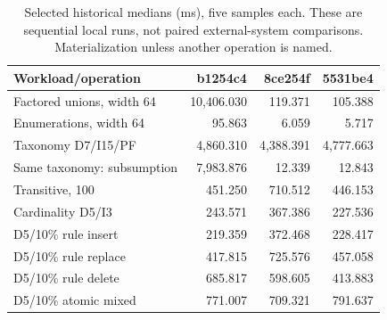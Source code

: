 \begin{table}[ht]
\caption{Selected historical medians (ms), five samples each. These are sequential local runs, not paired external-system comparisons. Materialization unless another operation is named.}
\label{tab:historical}
\centering\small
\begin{tabular}{@{}lrrr@{}}
\toprule
Workload/operation & b1254c4 & 8ce254f & 5531be4 \\
\midrule
Factored unions, width 64 & 10,406.030 & 119.371 & 105.388 \\
Enumerations, width 64 & 95.863 & 6.059 & 5.717 \\
Taxonomy D7/I15/PF & 4,860.310 & 4,388.391 & 4,777.663 \\
Same taxonomy: subsumption & 7,983.876 & 12.339 & 12.843 \\
Transitive, 100 & 451.250 & 710.512 & 446.153 \\
Cardinality D5/I3 & 243.571 & 367.386 & 227.536 \\
D5/10\% rule insert & 219.359 & 372.468 & 228.417 \\
D5/10\% rule replace & 417.815 & 725.576 & 457.058 \\
D5/10\% rule delete & 685.817 & 598.605 & 413.883 \\
D5/10\% atomic mixed & 771.007 & 709.321 & 791.637 \\
\bottomrule
\end{tabular}
\end{table}
